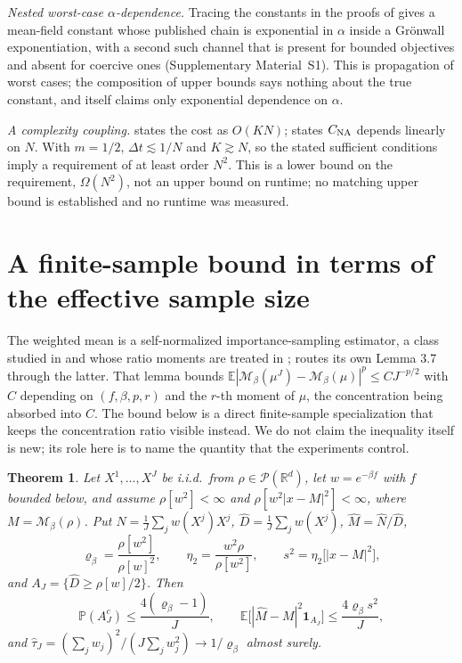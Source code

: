 \documentclass[pdflatex,sn-mathphys-num]{sn-jnl}
\theoremstyle{thmstyleone}
\newtheorem{theorem}{Theorem}
\theoremstyle{thmstyletwo}
\theoremstyle{thmstylethree}
\begin{document}
\emph{Nested worst-case $\alpha$-dependence.} Tracing the constants in the proofs of \cite[Lemma 3.10 and Proposition 3.11]{fkr2024} gives a mean-field constant whose published chain is exponential in $\alpha$ inside a Gr\"onwall exponentiation, with a second such channel that is present for bounded objectives and absent for coercive ones (Supplementary Material~S1). This is propagation of worst cases; the composition of upper bounds says nothing about the true constant, and \cite[Theorem 3.8]{fkr2024} itself claims only exponential dependence on $\alpha$.

\emph{A complexity coupling.} \cite[Remark 3.9]{fkr2024} states the cost as $O(KN)$; \cite[Theorem 3.8]{fkr2024} states $C_{\rm NA}$ depends linearly on $N$. With $m=1/2$, $\Delta t\lesssim1/N$ and $K\gtrsim N$, so the stated sufficient conditions imply a requirement of at least order $N^2$. This is a lower bound on the requirement, $\Omega(N^2)$, not an upper bound on runtime; no matching upper bound is established and no runtime was measured.

\section{A finite-sample bound in terms of the effective sample size}\label{sec5}

The weighted mean is a self-normalized importance-sampling estimator, a class studied in \cite{agapiou2017} and whose ratio moments are treated in \cite{doukhan2009}; \cite{ghv2025} routes its own Lemma 3.7 through the latter. That lemma bounds $\mathbb E|\mathcal M_\beta(\mu^J)-\mathcal M_\beta(\mu)|^p\le CJ^{-p/2}$ with $C$ depending on $(f,\beta,p,r)$ and the $r$-th moment of $\mu$, the concentration being absorbed into $C$. The bound below is a direct finite-sample specialization that keeps the concentration ratio visible instead. We do not claim the inequality itself is new; its role here is to name the quantity that the experiments control.

\begin{theorem}\label{thm:ess}
Let $X^1,\dots,X^J$ be i.i.d.\ from $\rho\in\mathcal P(\mathbb R^d)$, let $w=e^{-\beta f}$ with $f$ bounded below, and assume $\rho[w^2]<\infty$ and $\rho[w^2|x-M|^2]<\infty$, where $M=\mathcal M_\beta(\rho)$. Put $\hat N=\frac1J\sum_j w(X^j)X^j$, $\hat D=\frac1J\sum_j w(X^j)$, $\hat M=\hat N/\hat D$,
\[
\varrho_\beta=\frac{\rho[w^2]}{\rho[w]^2},\qquad \eta_2=\frac{w^2\rho}{\rho[w^2]},\qquad s^2=\eta_2\bigl[|x-M|^2\bigr],
\]
and $A_J=\{\hat D\ge\rho[w]/2\}$. Then
\begin{equation}\label{eq:thm}
\mathbb P(A_J^c)\le\frac{4(\varrho_\beta-1)}{J},\qquad
\mathbb E\bigl[|\hat M-M|^2\mathbf1_{A_J}\bigr]\le\frac{4\varrho_\beta s^2}{J},
\end{equation}
and $\hat\tau_J=(\sum_jw_j)^2/(J\sum_jw_j^2)\to1/\varrho_\beta$ almost surely.
\end{theorem}
\end{document}
